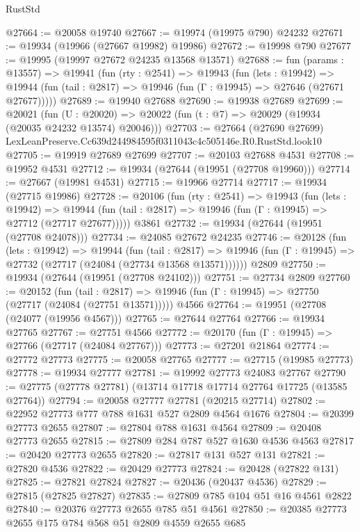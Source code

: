 \begin{lexlean}{RustStd}
\begin{coremodule}
@27664 := @20058 @19740
@27667 := @19974 (@19975 @790) @24232
@27671 := @19934 (@19966 (@27667 @19982) @19986)
@27672 := @19998 @790
@27677 := @19995 (@19997 @27672 @24235 @13568 @13571)
@27688 := fun (params : @13557) =>
  @19941
    (fun (rty : @2541) =>
    @19943
      (fun (lets : @19942) =>
      @19944 (fun (tail : @2817) => @19946 (fun (Γ : @19945) => @27646 (@27671 @27677)))))
@27689 := @19940 @27688
@27690 := @19938 @27689
@27699 := @20021
    (fun (U : @20020) => @20022 (fun (t : @7) => @20029 (@19934 (@20035 @24232 @13574) @20046)))
@27703 := @27664 (@27690 @27699) LexLeanPreserve.Cc639d244984595f0311043c4c505146e.R0.RustStd.look10
@27705 := @19919 @27689 @27699
@27707 := @20103 @27688 @4531
@27708 := @19952 @4531
@27712 := @19934 (@27644 (@19951 (@27708 @19960)))
@27714 := @27667 (@19981 @4531)
@27715 := @19966 @27714
@27717 := @19934 (@27715 @19986)
@27728 := @20106
    (fun (rty : @2541) =>
    @19943
      (fun (lets : @19942) =>
      @19944 (fun (tail : @2817) => @19946 (fun (Γ : @19945) => @27712 (@27717 @27677)))))
    @3861
@27732 := @19934 (@27644 (@19951 (@27708 @24078)))
@27734 := @24085 @27672 @24235
@27746 := @20128
    (fun (lets : @19942) =>
    @19944
      (fun (tail : @2817) =>
      @19946 (fun (Γ : @19945) => @27732 (@27717 (@24084 (@27734 @13568 @13571))))))
    @2809
@27750 := @19934 (@27644 (@19951 (@27708 @24102)))
@27751 := @27734 @2809
@27760 := @20152
    (fun (tail : @2817) => @19946 (fun (Γ : @19945) => @27750 (@27717 (@24084 (@27751 @13571)))))
    @4566
@27764 := @19951 (@27708 (@24077 (@19956 @4567)))
@27765 := @27644 @27764
@27766 := @19934 @27765
@27767 := @27751 @4566
@27772 := @20170 (fun (Γ : @19945) => @27766 (@27717 (@24084 @27767)))
@27773 := @27201 @21864
@27774 := @27772 @27773
@27775 := @20058 @27765
@27777 := @27715 (@19985 @27773)
@27778 := @19934 @27777
@27781 := @19992 @27773 @24083 @27767
@27790 := @27775 (@27778 @27781) (@13714 @17718 @17714 @27764 @17725 (@13585 @27764))
@27794 := @20058 @27777 @27781 (@20215 @27714)
@27802 := @22952 @27773 @777 @788 @1631 @527 @2809 @4564 @1676
@27804 := @20399 @27773 @2655
@27807 := @27804 @788 @1631 @4564
@27809 := @20408 @27773 @2655
@27815 := @27809 @284 @787 @527 @1630 @4536 @4563
@27817 := @20420 @27773 @2655
@27820 := @27817 @131 @527 @131
@27821 := @27820 @4536
@27822 := @20429 @27773
@27824 := @20428 (@27822 @131)
@27825 := @27821 @27824
@27827 := @20436 (@20437 @4536)
@27829 := @27815 (@27825 @27827)
@27835 := @27809 @785 @104 @51 @16 @4561 @2822
@27840 := @20376 @27773 @2655 @785 @51 @4561
@27850 := @20385 @27773 @2655 @175 @784 @568 @51 @2809 @4559 @2655 @685

\end{coremodule}
\end{lexlean}
